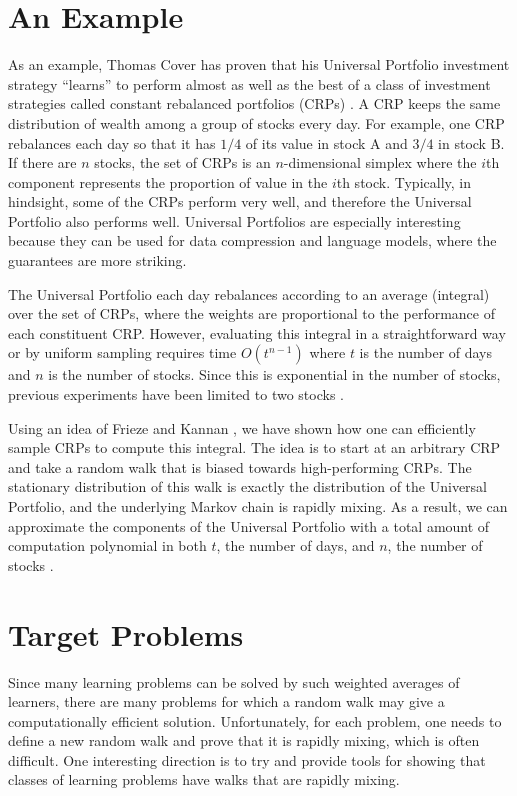\section{An Example}
As an example, Thomas Cover has proven that his Universal Portfolio investment
strategy ``learns'' to perform almost as well as the best of a class of
investment strategies called constant rebalanced portfolios (CRPs) \cite{Cover}.  A CRP
keeps the same distribution of wealth among a group of stocks every day.  For
example, one CRP rebalances each day so that it has $1/4$ of its value in
stock A and $3/4$ in stock B.  If there are $n$ stocks, the set of CRPs is an
$n$-dimensional simplex where the $i$th component represents the proportion of
value in the $i$th stock.  Typically, in hindsight, some of the CRPs perform
very well, and therefore the Universal Portfolio also performs well.
Universal Portfolios are especially interesting because they can be used for
data compression and language models, where the guarantees are more striking.

The Universal Portfolio each day rebalances according to an average (integral)
over the set of CRPs, where the weights are proportional to the performance of
each constituent CRP.  However, evaluating this integral in a straightforward
way or by uniform sampling requires time $O(t^{n-1})$ where $t$ is the number
of days and $n$ is the number of stocks.  Since this is exponential in the
number of stocks, previous experiments have been limited to two stocks
\cite{Cover, BK, Helmbold}.

Using an idea of Frieze and Kannan \cite{FK}, we have shown how one can
efficiently sample CRPs to compute this integral.  The idea is to start at an
arbitrary CRP and take a random walk that is biased towards high-performing
CRPs.  The stationary distribution of this walk is exactly the distribution of
the Universal Portfolio, and the underlying Markov chain is rapidly mixing.
As a result, we can approximate the components of the Universal Portfolio with
a total amount of computation polynomial in both $t$, the number of days, and
$n$, the number of stocks \cite{KV}.


\section{Target Problems}
Since many learning problems can be solved by such weighted averages of
learners, there are many problems for which a random walk may give a
computationally efficient solution.  Unfortunately, for each problem, one
needs to define a new random walk and prove that it is rapidly mixing, which
is often difficult.  One interesting direction is to try and provide tools for
showing that classes of learning problems have walks that are rapidly mixing. 

